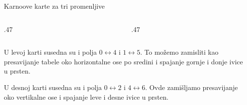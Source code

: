 \begin{frame}[label=02-s035]{Karnoove karte za tri promenljive}
\setlength{\parskip}{0pt}
\begin{columns}[T,onlytextwidth]
\begin{column}{.47\textwidth}\centering
{}\vspace{1mm}

\end{column}
\begin{column}{.47\textwidth}\centering
{}\vspace{1mm}

\end{column}
\end{columns}
\par
U levoj karti susedna su i polja \(0\leftrightarrow4\) i \(1\leftrightarrow5\). To možemo zamisliti kao presavijanje tabele oko horizontalne ose po sredini i spajanje gornje i donje ivice u prsten.
\par\vspace{1mm}
U desnoj karti susedna su i polja \(0\leftrightarrow2\) i \(4\leftrightarrow6\). Ovde zamišljamo presavijanje oko vertikalne ose i spajanje leve i desne ivice u prsten.
\end{frame}
